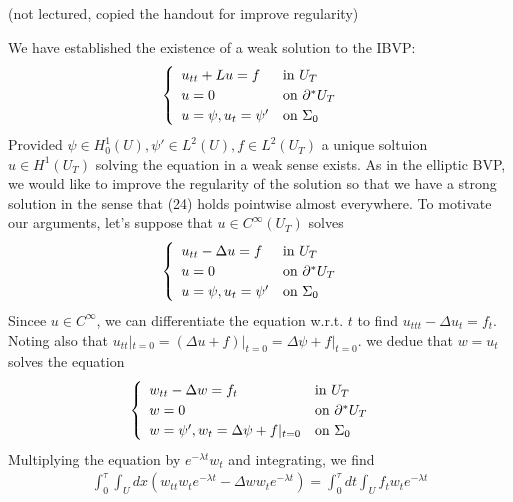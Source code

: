 \documentclass[12pt,a4paper]{report}
\begin{document}
\newday

(not lectured, copied the handout for improve regularity)
\s

We have established the existence of a weak solution to the IBVP:
\begin{align}
\begin{cases}
\begin{array}{ll}
u_{tt}+Lu =f & \text{in }U_T\\
u=0 & \text{on } \partial^* U_T\\
u=\psi, u_t =\psi' & \text{on }\Sigma_0
\end{array}
\end{cases} \label{111}
\end{align}
Provided $\psi\in H_0^1 (U), \psi'\in L^2(U), f\in L^2(U_T)$ a unique soltuion $u\in H^1(U_T)$ solving the equation in a weak sense exists. As in the elliptic BVP, we would like to improve the regularity of the solution so that we have a strong solution in the sense that (24) holds pointwise almost everywhere. To motivate our arguments, let's suppose that $u\in C^{\infty}(U_T)$ solves
\begin{align*}
\begin{cases}
\begin{array}{ll}
u_{tt}-\Delta u =f & \text{in }U_T\\
u=0& \text{on } \partial^* U_T\\
u=\psi, u_t =\psi' & \text{on }\Sigma_0
\end{array}
\end{cases}
\end{align*} 
Sincee $u\in C^{\infty}$, we can differentiate the equation w.r.t. $t$ to find $u_{ttt}-\Delta u_t = f_t$. Noting also that $u_{tt}|_{t=0} = (\Delta u + f)|_{t=0} = \Delta \psi + f|_{t=0}$. we dedue that $w= u_t$ solves the equation
\begin{align*}
\begin{cases}
\begin{array}{ll}
w_{tt} - \Delta w =f_t & \text{in }U_T\\
w=0& \text{on } \partial^* U_T\\
w=\psi', w_t =\Delta \psi + f|_{t=0} & \text{on }\Sigma_0
\end{array}
\end{cases}
\end{align*}
Multiplying the equation by $e^{-\lambda t}w_t$ and integrating, we find
\begin{align*}
\int_0^{\tau} \int_U dx (w_{tt}w_t e^{-\lambda t}- \Delta w w_t e^{-\lambda t})= \int_0^{\tau} dt\int_U f_t w_t e^{-\lambda t}
\end{align*}
\end{document}
